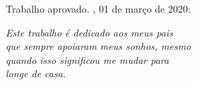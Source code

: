 \documentclass[
12pt,				%
openright,			%
twoside,			%
a4paper,			%
english,			%
french,				%
spanish,			%
brazil				%
]{abntex2}
\begin{document}

%
% 
%
\begin{folhadeaprovacao}
	
	\begin{center}
		{\ABNTEXchapterfont\large\imprimirautor}
		
		\vspace*{\fill}\vspace*{\fill}
		\begin{center}
			\ABNTEXchapterfont\bfseries\Large\imprimirtitulo
		\end{center}
		\vspace*{\fill}
		
		\hspace{.45\textwidth}
		\begin{minipage}{.5\textwidth}
			\imprimirpreambulo
		\end{minipage}%
		\vspace*{\fill}
	\end{center}
	
	Trabalho aprovado. \imprimirlocal, 01 de março de 2020:
	
	
	\begin{center}
		\vspace*{0.5cm}
		{\large\imprimirlocal}
		\par
		{\large\imprimirdata}
		\vspace*{1cm}
	\end{center}
	
\end{folhadeaprovacao}

\begin{dedicatoria}
	\vspace*{\fill}
	\centering
	\noindent
	\textit{Este trabalho é dedicado aos meus pais \\ que sempre apoiaram meus sonhos, mesmo \\ quando isso significou me mudar para \\ longe de casa.} \vspace*{\fill}
\end{dedicatoria}
\end{document}
